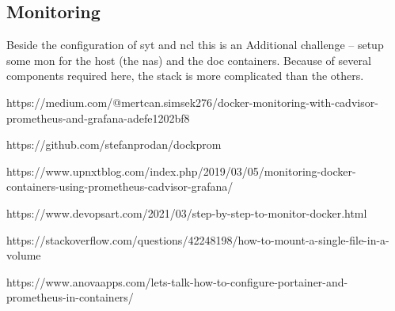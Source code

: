 

\subsection{Monitoring}

Beside the configuration of \gls{syt} and \gls{ncl} this is an Additional
challenge -- setup some \gls{mon} for the host (the \gls{nas}) and the
\gls{doc} containers. Because of several components required here, the
stack is more complicated than the others.
\bigbreak


https://medium.com/@mertcan.simsek276/docker-monitoring-with-cadvisor-prometheus-and-grafana-adefe1202bf8

https://github.com/stefanprodan/dockprom

https://www.upnxtblog.com/index.php/2019/03/05/monitoring-docker-containers-using-prometheus-cadvisor-grafana/

https://www.devopsart.com/2021/03/step-by-step-to-monitor-docker.html

https://stackoverflow.com/questions/42248198/how-to-mount-a-single-file-in-a-volume

https://www.anovaapps.com/lets-talk-how-to-configure-portainer-and-prometheus-in-containers/
